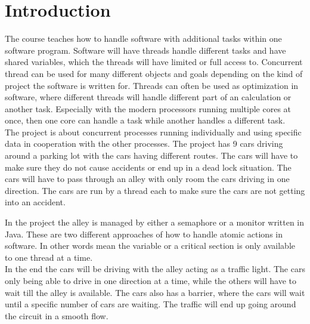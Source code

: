 \section{Introduction}
The course teaches how to handle software with additional tasks within one software program. Software will have threads handle different tasks and have shared variables, which the threads will have limited or full access to. Concurrent thread can be used for many different objects and goals depending on the kind of project the software is written for. Threads can often be used as optimization in software, where different threads will handle different part of an calculation or another task. Especially with the modern processors running multiple cores at once, then one core can handle a task while another handles a different task.
\\

The project is about concurrent processes running individually and using specific data in cooperation with the other processes. The project has 9 cars driving around a parking lot with the cars having different routes. The cars will have to make sure they do not cause accidents or end up in a dead lock situation. The cars will have to pass through an alley with only room the cars driving in one direction. The cars are run by a thread each to make sure the cars are not getting into an accident. 

In the project the alley is managed by either a semaphore or a monitor written in Java. These are two different approaches of how to handle atomic actions in software. In other words mean the variable or a critical section is only available to one thread at a time.
\\

In the end the cars will be driving with the alley acting as a traffic light. The cars only being able to drive in one direction at a time, while the others will have to wait till the alley is available. The cars also has a barrier, where the cars will wait until a specific number of cars are waiting. The traffic will end up going around the circuit in a smooth flow.